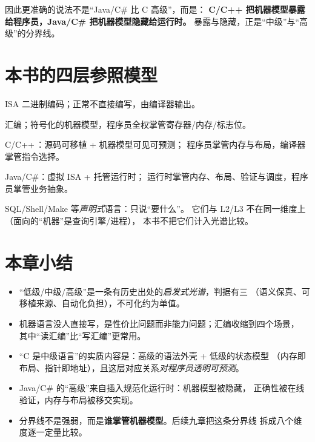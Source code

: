 \documentclass[12pt,a4paper,fontset=fandol]{ctexbook}
\newcommand{\Cv}{C/\Cplus{}}
\newcommand{\Cplus}[1]{C++\,#1}
\begin{document}
因此更准确的说法不是``Java/C\# 比 C 高级''，而是：
\textbf{C/C++ 把机器模型暴露给程序员，Java/C\# 把机器模型隐藏给运行时。}
暴露与隐藏，正是``中级''与``高级''的分界线。

\section{本书的四层参照模型}

\begin{levelspectrum}[title=四层参照模型（后续章节的坐标系）]
\begin{description}
  \setlength{\itemsep}{3pt}
  \item[L0 机器语言] ISA 二进制编码；正常不直接编写，由编译器输出。
  \item[L1 低级语言] 汇编；符号化的机器模型，程序员全权掌管寄存器/内存/标志位。
  \item[L2 中级语言] \Cv{}：源码可移植 + 机器模型可见可预测；
       程序员掌管内存与布局，编译器掌管指令选择。
  \item[L3 高级/托管语言] Java/C\#：虚拟 ISA + 托管运行时；
       运行时掌管内存、布局、验证与调度，程序员掌管业务抽象。
  \item[L4 超高层] SQL/Shell/Make 等\emph{声明式}语言：只说``要什么''。
       它们与 L2/L3 不在同一维度上（面向的``机器''是查询引擎/进程），
       本书不把它们计入光谱比较。
\end{description}
\end{levelspectrum}

\section{本章小结}

\begin{guideline}
\begin{itemize}
  \item ``低级/中级/高级''是一条有历史出处的\emph{启发式光谱}，判据有三
        （语义保真、可移植来源、自动化负担），不可化约为单值。
  \item 机器语言没人直接写，是性价比问题而非能力问题；汇编收缩到四个场景，
        其中``读汇编''比``写汇编''更常用。
  \item ``C 是中级语言''的实质内容是：高级的语法外壳 + 低级的状态模型
        （内存即布局、指针即地址），且这层对应关系\emph{对程序员透明可预测}。
  \item Java/C\# 的``高级''来自插入规范化运行时：机器模型被隐藏，
        正确性被在线验证，内存与布局被移交实现。
  \item 分界线不是强弱，而是\textbf{谁掌管机器模型}。后续九章把这条分界线
        拆成八个维度逐一定量比较。
\end{itemize}
\end{guideline}
\end{document}
